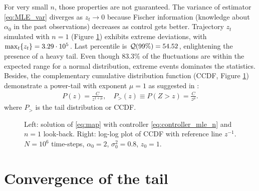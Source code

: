 \documentclass[FinalReport.tex]{subfiles}
\begin{document}
For very small $n$, those properties are not guaranteed. The variance of estimator \eqref{eq:MLE_var} diverges as $z_t\rightarrow0$ because Fischer information (knowledge about $\alpha_0$ in the past observations) decreases as control gets better. 
Trajectory $z_t$ simulated with $n=1$ (Figure \ref{fig:dist_n=1}) exhibits extreme deviations, with $\max_{t}\{z_t\}=3.29\cdot10^{5}$. Last percentile is $\mathcal{Q}(99\%)=54.52$, enlightening the presence of a heavy tail. Even though $83.3\%$ of the fluctuations are within the expected range for a normal distribution, extreme events dominates the statistics.
 Besides, the complementary cumulative distribution function (CCDF, Figure \ref{fig:dist_n=1}) demonstrate a power-tail with exponent $\mu=1$ as suggested in \cite{OptCont, FrontNanoScience}:
\begin{align}\label{eq:pt}
	P(z)=\frac{C}{z^{1+\mu}}, \quad P_>(z)\equiv P(Z>z)=\frac{C}{z^\mu}.
\end{align}
where $P_>$ is the tail distribution or CCDF.
\begin{figure}[h!]
	\centering
	\caption{Left: solution of \eqref{eq:map} with controller \eqref{eq:controller_mle_n} and $n=1$ look-back. Right: log-log plot of CCDF with reference line $z^{-1}$. $N=10^6$ time-steps, $\alpha_0=2$, $\sigma_0^2=0.8$, $z_0=1$.}
	\label{fig:dist_n=1}
\end{figure}

\section{Convergence of the tail}
\end{document}

